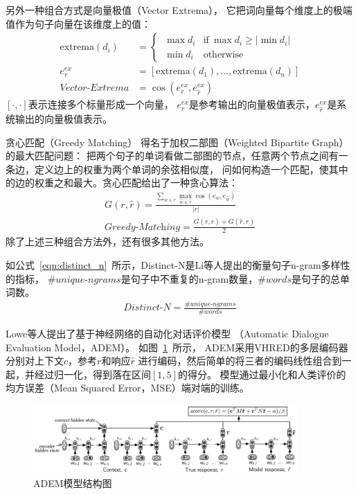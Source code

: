 另外一种组合方式是向量极值（Vector Extrema），
它把词向量每个维度上的极端值作为句子向量在该维度上的值：
\begin{align}
    \text{extrema}(d_i) &=
    \begin{cases}
        \ \max d_i & \text{if}\ \max d_i \geq |\min d_i| \\
        \ \min d_i & \text{otherwise}
    \end{cases} \\
    e_r^{ex} &= [\text{extrema}(d_1), \dots, \text{extrema}(d_n)] \\
    \textit{Vector-Extrema} &= \cos( e_r^{ex}, e_{\hat{r}}^{ex} )
\end{align}
$[\cdot, \cdot]$表示连接多个标量形成一个向量，
$e_r^{ex}$是参考输出的向量极值表示，$e_{\hat{r}}^{ex}$是系统输出的向量极值表示。

贪心匹配（Greedy Matching）
得名于加权二部图（Weighted Bipartite Graph）的最大匹配问题：
把两个句子的单词看做二部图的节点，任意两个节点之间有一条边，定义边上的权重为两个单词的余弦相似度，
问如何构造一个匹配，使其中的边的权重之和最大。贪心匹配给出了一种贪心算法：
\begin{align}
    G(r, \hat{r}) = \frac{
    \sum_{w \in r} \max_{\hat{w} \in \hat{r}} \cos(e_w, e_{\hat{w}})
    }{ |r| } \\
    \textit{Greedy-Matching} = \frac{
    G(r, \hat{r}) + G(\hat{r}, r)
    }{2}
\end{align}
除了上述三种组合方法外，还有很多其他方法。

如公式~\ref{eqn:distinct_n}~所示，Distinct-N是Li等人提出的衡量句子n-gram多样性的指标，
$\#\textit{unique-ngrams}$是句子中不重复的n-gram数量，$\#\textit{words}$是句子的总单词数。
\begin{align}
    \textit{Distinct-N} = \frac{\#\textit{unique-ngrams}}{\#\textit{words}}
    \label{eqn:distinct_n}
\end{align}

Lowe等人提出了基于神经网络的自动化对话评价模型
（Automatic Dialogue Evaluation Model，ADEM）。
如图~\ref{fig:ADEM_model}~所示，
ADEM采用VHRED的多层编码器分别对上下文$c$，参考$r$和响应$\hat{r}$
进行编码，然后简单的将三者的编码线性组合到一起，并经过归一化，得到落在区间$[1, 5]$的得分。
模型通过最小化和人类评价的均方误差（Mean Squared Error，MSE）端对端的训练。
\begin{figure}[H]
    \centering
    \includegraphics[width=0.9\textwidth]{figure/ADEM.pdf}
    \caption{ADEM模型结构图}
    \label{fig:ADEM_model}
\end{figure}

